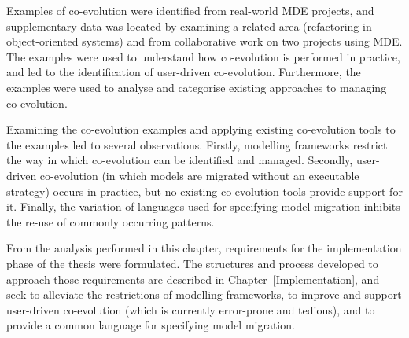 Examples of co-evolution were identified from real-world MDE projects, and supplementary data was located by examining a related area (refactoring in object-oriented systems) and from collaborative work on two projects using MDE. The examples were used to understand how co-evolution is performed in practice, and led to the identification of user-driven co-evolution. Furthermore, the examples were used to analyse and categorise existing approaches to managing co-evolution.

Examining the co-evolution examples and applying existing co-evolution tools to the examples led to several observations. Firstly, modelling frameworks restrict the way in which co-evolution can be identified and managed. Secondly, user-driven co-evolution (in which models are migrated without an executable strategy) occurs in practice, but no existing co-evolution tools provide support for it. Finally, the variation of languages used for specifying model migration inhibits the re-use of commonly occurring patterns.

From the analysis performed in this chapter, requirements for the implementation phase of the thesis were formulated. The structures and process developed to approach those requirements are described in Chapter~\ref{Implementation}, and seek to alleviate the restrictions of modelling frameworks, to improve and support user-driven co-evolution (which is currently error-prone and tedious), and to provide a common language for specifying model migration.

